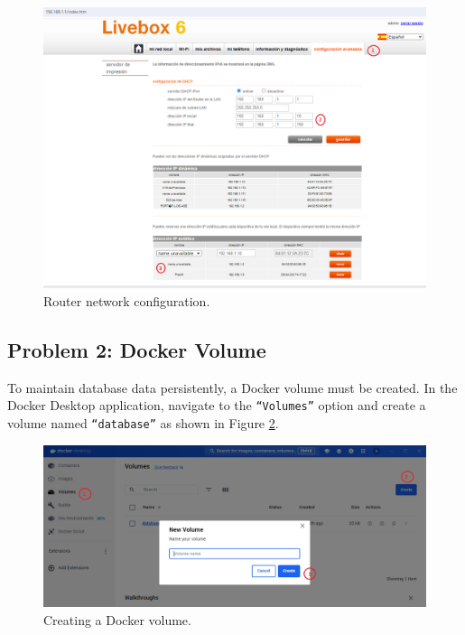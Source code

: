\documentclass{article}
\begin{document}
\begin{figure}[H]
    \raggedright
    \includegraphics[width=1\linewidth]{../images/router_config.png}
    \caption{\label{fig:configuracion router}Router network configuration.}
\end{figure}

\subsection{Problem 2: Docker Volume}

To maintain database data persistently, a Docker volume must be created. In the Docker Desktop application, navigate to the \texttt{``Volumes''} option and create a volume named \texttt{``database''} as shown in Figure \ref{fig:volumen docker}.

\begin{figure}[H]
    \raggedright
    \includegraphics[width=1\linewidth]{../images/volumen_docker.png}
    \caption{\label{fig:volumen docker}Creating a Docker volume.}
\end{figure}
\end{document}
